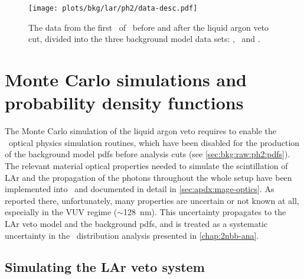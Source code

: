 \begin{figure}
  \centering
  \texttt{[image: plots/bkg/lar/ph2/data-desc.pdf]}
  \caption{%
    The data from the first \gexpophasetwobkg\ of \gerdatwo\ before and after the liquid argon veto
    cut, divided into the three background model data sets: \enrBEGeII, \enrCoaxII\ and
    \enrGeII.
  }\label{fig:bkg:lar:ph2:data-desc}
\end{figure}

\section{Monte Carlo simulations and probability density functions}%
\label{sec:bkg:lar:ph2:pdfs}

The Monte Carlo simulation of the liquid argon veto requires to enable the \geant\ optical physics
simulation routines, which have been disabled for the production of the background model
pdfs before analysis cuts (see \cref{sec:bkg:raw:ph2:pdfs}). The relevant material
optical properties needed to simulate the scintillation of LAr and the propagation of the
photons throughout the whole setup have been implemented into \mage\ and documented in
detail in \cref{sec:apdx:mage-optics}. As reported there, unfortunately, many properties
are uncertain or not known at all, especially in the VUV regime ($\sim$128~nm). This
uncertainty propagates to the LAr veto model and the background pdfs, and is treated as a
systematic uncertainty in the \nnbb\ distribution analysis presented in
\cref{chap:2nbb-ana}.

\subsection{Simulating the LAr veto system}%
\label{sec:bkg:lar:ph2:heatmap}

